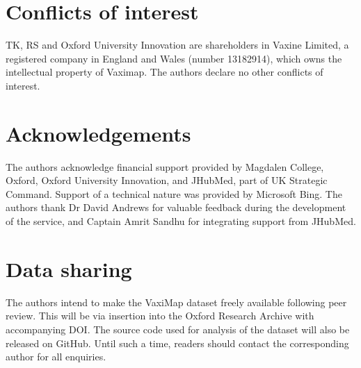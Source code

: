 \documentclass[review]{elsarticle}
\def\vm{VaxiMap}
\begin{document}
\section{Conflicts of interest}

TK, RS and Oxford University Innovation are shareholders in Vaxine Limited, a registered company in England and Wales (number 13182914), which owns the intellectual property of Vaximap. The authors declare no other conflicts of interest. 

\section{Acknowledgements}

The authors acknowledge financial support provided by Magdalen College, Oxford, Oxford University Innovation, and JHubMed, part of UK Strategic Command. Support of a technical nature was provided by Microsoft Bing. The authors thank Dr David Andrews for valuable feedback during the development of the service, and Captain Amrit Sandhu for integrating support from JHubMed. 

\section{Data sharing}

The authors intend to make the \vm{} dataset freely available following peer review. This will be via insertion into the Oxford Research Archive with accompanying DOI. The source code used for analysis of the dataset will also be released on GitHub. Until such a time, readers should contact the corresponding author for all enquiries. 




\end{document}
